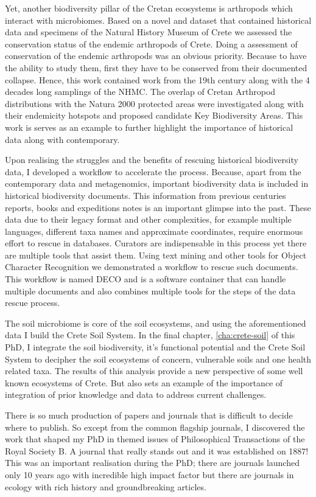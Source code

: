 \documentclass[
11pt, %
english, %
singlespacing, %
liststotoc, %
toctotoc, %
headsepline, %
]{MastersDoctoralThesis} %
\begin{document}
Yet, another biodiversity pillar of the Cretan ecosystems is arthropods which 
interact with microbiomes. Based on a novel and dataset
that contained historical data and specimens of the Natural History Museum of Crete
we assessed the conservation status of the endemic arthropods of Crete. Doing a assessment of 
conservation of the endemic arthropods was an obvious priority. Because to have the ability to 
study them, first they have to be conserved from their documented collapse. Hence, this work contained 
work from the 19th century along with the 4 decades long samplings of the NHMC. 
The overlap of Cretan Arthropod distributions with the Natura 2000 protected areas
were investigated along with their endemicity hotspots and proposed candidate Key Biodiversity Areas.
This work is serves as an example to further highlight the importance of historical data along with contemporary.

Upon realising the struggles and the benefits of rescuing historical biodiversity data, I
developed a workflow to accelerate the process. Because, apart from the contemporary data and metagenomics, important biodiversity data is 
included in historical biodiversity documents. This information from 
previous centuries reports, books and expeditions notes is an important glimpse into
the past. These data due to their legacy format and other complexities, for example 
multiple languages, different taxa names and approximate coordinates, require 
enormous effort to rescue in databases. Curators are indispensable in this process 
yet there are multiple tools that assist them. Using text mining and other tools 
for Object Character Recognition we demonstrated a workflow to rescue such documents.
This workflow is named DECO and is a software container that can handle multiple 
documents and also combines multiple tools for the steps of the data rescue process.

The soil microbiome is core of the soil ecosystems, and using the aforementioned data I build the Crete Soil System.
In the final chapter, \ref{cha:crete-soil} of this PhD, I integrate the soil biodiversity, it's functional potential and 
the Crete Soil System to decipher the soil ecosystems of concern, vulnerable soils and one health related taxa. The results 
of this analysis provide a new perspective of some well known ecosystems of Crete.
But also sets an example of the importance of integration of prior knowledge and data to address current challenges.

There is so much production of papers and journals that is difficult to decide where to publish. 
So except from the common flagship journals, I discovered the work that shaped my 
PhD in themed issues of Philosophical Transactions of the Royal Society B.
A journal that really stands out and it was established on 1887! This was an
important realisation during the PhD; there are journals launched only 10 years
ago with incredible high impact factor but there are journals in ecology
with rich history and groundbreaking articles.
\end{document}
